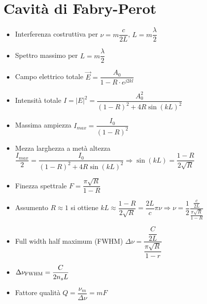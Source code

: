 \documentclass{article}
\begin{document}
\section {Cavità di Fabry-Perot}
\begin{itemize}
		\item Interferenza costruttiva per \(  \nu = m \dfrac{c}{2L} \), \( L = m \dfrac{\lambda}{2} \)
		\item Spettro massimo per \( L = m \dfrac{\lambda}{2} \)
		\item Campo elettrico totale \( \vec{E} = \dfrac{A_0}{1-R \cdot e^ {j 2 k l}} \)
		\item Intensità totale \( I = | E | ^ 2 = \dfrac{A_0^2}{(1-R)^2+ 4 R \sin(kL)^2} \) 
		\item Massima ampiezza \( I_{max} = \dfrac{I_0}{(1-R)^2} \)
		\item Mezza larghezza a metà altezza \(  \dfrac{I_{max}}{2} = \dfrac{I_0}{(1- R)^2 + 4 R \sin(k L) ^ 2} \Rightarrow \sin(k L) = \dfrac{1 - R}{2 \sqrt{R}}\)
		\item Finezza spettrale \( F = \dfrac{\pi \sqrt{R}}{1-R} \)
		\item Assumento \( R \approx 1 \) si ottiene \( kL \approx \dfrac{1 - R}{2 \sqrt{R}} = \dfrac{2L}{c} \pi \nu \Rightarrow \nu = \dfrac{1}{2} \dfrac{ \frac{c}{2L}}{\frac{\pi \sqrt{R}}{1-R}}\)
		\item Full width half maximum (FWHM) \( \Delta \nu  = \dfrac{\dfrac{C}{2L}}{\dfrac{\pi \sqrt{R}}{1 - r}} \)
		\item \( \Delta \nu _ {\textnormal{FWHM}} = \dfrac{C}{2 n_s L} \)
		\item Fattore qualità \( Q = \dfrac{\nu_m}{\Delta \nu} = m F \)	 
\end{itemize}
\end{document}
